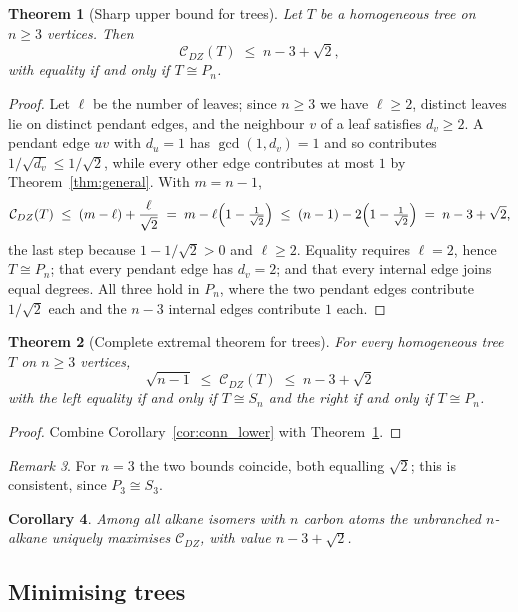 \documentclass[11pt,a4paper]{article}
\theoremstyle{plain}
\newtheorem{theorem}{Theorem}[section]
\newtheorem{corollary}[theorem]{Corollary}
\theoremstyle{definition}
\theoremstyle{remark}
\newtheorem{remark}[theorem]{Remark}
\newcommand{\CDZ}{\mathcal{C}_{DZ}}
\newcommand{\gcdd}{\operatorname{gcd}}
\begin{document}
\begin{theorem}[Sharp upper bound for trees]
\label{thm:tree}
Let $T$ be a homogeneous tree on $n\ge3$ vertices. Then
\[
  \CDZ(T)\;\le\;n-3+\sqrt2,
\]
with equality if and only if $T\cong P_n$.
\end{theorem}

\begin{proof}
Let $\ell$ be the number of leaves; since $n\ge3$ we have $\ell\ge2$, distinct
leaves lie on distinct pendant edges, and the neighbour $v$ of a leaf satisfies
$d_v\ge2$. A pendant edge $uv$ with $d_u=1$ has $\gcdd(1,d_v)=1$ and so
contributes $1/\sqrt{d_v}\le1/\sqrt2$, while every other edge contributes at most
$1$ by Theorem~\ref{thm:general}. With $m=n-1$,
\[
  \CDZ(T)\;\le\;(m-\ell)+\frac{\ell}{\sqrt2}
  \;=\; m-\ell\Bigl(1-\tfrac1{\sqrt2}\Bigr)
  \;\le\;(n-1)-2\Bigl(1-\tfrac1{\sqrt2}\Bigr) \;=\; n-3+\sqrt2,
\]
the last step because $1-1/\sqrt2>0$ and $\ell\ge2$. Equality requires $\ell=2$,
hence $T\cong P_n$; that every pendant edge has $d_v=2$; and that every internal
edge joins equal degrees. All three hold in $P_n$, where the two pendant edges
contribute $1/\sqrt2$ each and the $n-3$ internal edges contribute $1$ each.
\end{proof}

\begin{theorem}[Complete extremal theorem for trees]
\label{thm:complete_tree}
For every homogeneous tree $T$ on $n\ge3$ vertices,
\[
  \boxed{\;\sqrt{n-1}\;\le\;\CDZ(T)\;\le\;n-3+\sqrt2\;}
\]
with the left equality if and only if $T\cong S_n$ and the right if and only if
$T\cong P_n$.
\end{theorem}

\begin{proof}
Combine Corollary~\ref{cor:conn_lower} with Theorem~\ref{thm:tree}.
\end{proof}

\begin{remark}
For $n=3$ the two bounds coincide, both equalling $\sqrt2$; this is consistent,
since $P_3\cong S_3$.
\end{remark}

\begin{corollary}
\label{cor:alkane_max}
Among all alkane isomers with $n$ carbon atoms the unbranched $n$-alkane
uniquely maximises $\CDZ$, with value $n-3+\sqrt2$.
\end{corollary}

\subsection{Minimising trees}
\label{sec:minimisers}
\end{document}
